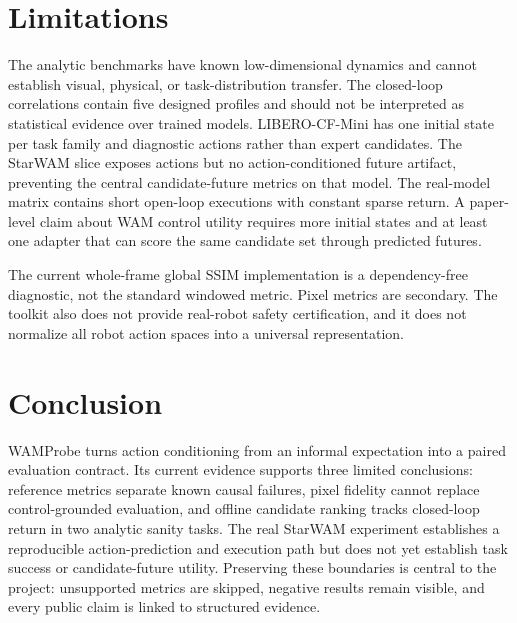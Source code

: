 \documentclass[10pt]{article}
\begin{document}
\section{Limitations}

The analytic benchmarks have known low-dimensional dynamics and cannot establish visual,
physical, or task-distribution transfer. The closed-loop correlations contain five
designed profiles and should not be interpreted as statistical evidence over trained
models. LIBERO-CF-Mini has one initial state per task family and diagnostic actions rather
than expert candidates. The StarWAM slice exposes actions but no action-conditioned future
artifact, preventing the central candidate-future metrics on that model. The real-model
matrix contains short open-loop executions with constant sparse return. A paper-level
claim about WAM control utility requires more initial states and at least one adapter that
can score the same candidate set through predicted futures.

The current whole-frame global SSIM implementation is a dependency-free diagnostic, not
the standard windowed metric. Pixel metrics are secondary. The toolkit also does not
provide real-robot safety certification, and it does not normalize all robot action spaces
into a universal representation.

\section{Conclusion}

WAMProbe turns action conditioning from an informal expectation into a paired evaluation
contract. Its current evidence supports three limited conclusions: reference metrics
separate known causal failures, pixel fidelity cannot replace control-grounded evaluation,
and offline candidate ranking tracks closed-loop return in two analytic sanity tasks. The
real StarWAM experiment establishes a reproducible action-prediction and execution path but
does not yet establish task success or candidate-future utility. Preserving these boundaries
is central to the project: unsupported metrics are skipped, negative results remain visible,
and every public claim is linked to structured evidence.



\end{document}
